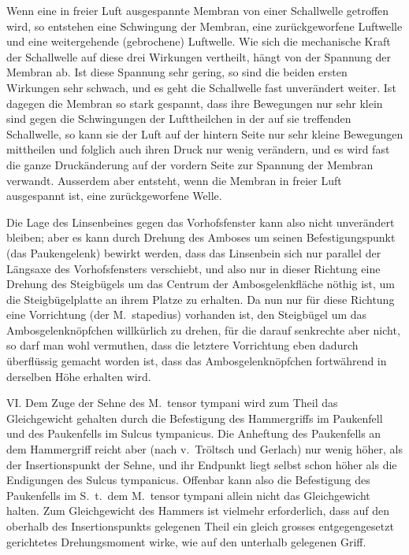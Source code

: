 \documentclass[12pt,a4paper]{article}
\begin{document}
Wenn eine in freier Luft ausgespannte Membran von einer Schallwelle getroffen wird, so entstehen eine Schwingung der Membran, eine zur\"uckgeworfene Luftwelle und eine weitergehende (gebrochene) Luftwelle. Wie sich die mechanische Kraft der Schallwelle auf diese drei Wirkungen vertheilt, h\"angt von der Spannung der Membran ab. Ist diese Spannung sehr gering, so sind die beiden ersten Wirkungen sehr schwach, und es geht die Schallwelle fast unver\"andert weiter. Ist dagegen die Membran so stark gespannt, dass ihre Bewegungen nur sehr klein sind gegen die Schwingungen der Lufttheilchen in der auf sie treffenden Schallwelle, so kann sie der Luft auf der hintern Seite nur sehr kleine Bewegungen mittheilen und folglich auch ihren Druck nur wenig ver\"andern, und es wird fast die ganze Druck\"anderung auf der vordern Seite zur Spannung der Membran verwandt. Ausserdem aber entsteht, wenn die Membran in freier Luft ausgespannt ist, eine zur\"uckgeworfene Welle.

\newpage

Die Lage des Linsenbeines gegen das Vorhofsfenster kann also nicht unver\"andert bleiben; aber es kann durch Drehung des Amboses um seinen Befestigungspunkt (das Paukengelenk) bewirkt werden, dass das Linsenbein sich nur parallel der L\"angsaxe des Vorhofsfensters verschiebt, und also nur in dieser Richtung eine Drehung des Steigb\"ugels um das Centrum der Ambosgelenkfl\"ache n\"othig ist, um die Steigb\"ugelplatte an ihrem Platze zu erhalten. Da nun nur f\"ur diese Richtung eine Vorrichtung (der M.~stapedius) vorhanden ist, den Steigb\"ugel um das Ambosgelenkn\"opfchen willk\"urlich zu drehen, f\"ur die darauf senkrechte aber nicht, so darf man wohl vermuthen, dass die letztere Vorrichtung eben dadurch \"uberfl\"ussig gemacht worden ist, dass das Ambosgelenkn\"opfchen fortw\"ahrend in derselben H\"ohe erhalten wird.

VI. Dem Zuge der Sehne des M.~tensor tympani wird zum Theil das Gleichgewicht gehalten durch die Befestigung des Hammergriffs im Paukenfell und des Paukenfells im Sulcus tympanicus. Die Anheftung des Paukenfells an dem Hammergriff reicht aber (nach v.~Tr\"oltsch und Gerlach) nur wenig h\"oher, als der Insertionspunkt der Sehne, und ihr Endpunkt liegt selbst schon h\"oher als die Endigungen des Sulcus tympanicus. Offenbar kann also die Befestigung des Paukenfells im S.~t.\ dem M.~tensor tympani allein nicht das Gleichgewicht halten. Zum Gleichgewicht des Hammers ist vielmehr erforderlich, dass auf den oberhalb des Insertionspunkts gelegenen Theil ein gleich grosses entgegengesetzt gerichtetes Drehungsmoment wirke, wie auf den unterhalb gelegenen Griff.
\end{document}
